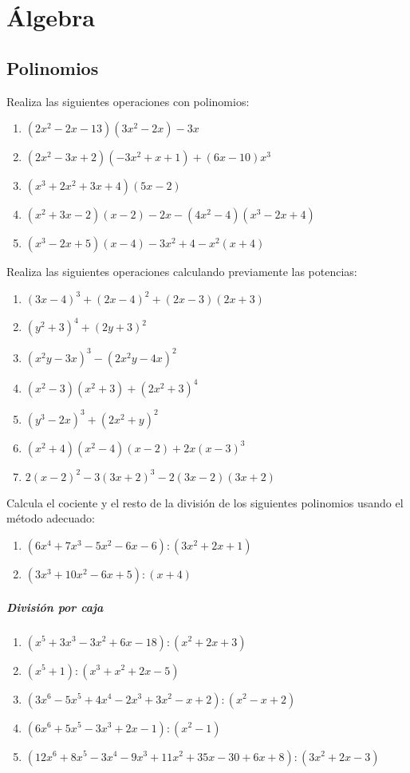 \chapter{Álgebra}
\setcounter{exercicio}{0}

\section{Polinomios}

\Exercicio Realiza las siguientes operaciones con polinomios:
\begin{enumerate}[topsep=0pt]
	\item $(2x^2-2x-13)(3x^2-2x)-3x$
	\item $(2x^2-3x+2)(-3x^2+x+1) + (6x-10)x^3$
	\item $(x^3+2x^2+3x+4)(5x-2)$
	\item $(x^2+3x -2)(x-2) - 2x - (4x^2-4)(x^3-2x+4)$
	\item $(x^3-2x+5)(x-4) - 3x^2 + 4 - x^2(x+4)$
\end{enumerate}


\Exercicio Realiza las siguientes operaciones calculando previamente las potencias:
\begin{enumerate}[topsep=0pt]
	\item $(3x-4)^3 + (2x - 4)^2 + (2x - 3)(2x+3)$
	\item $(y^2+3)^4 + (2y +3)^2$
	\item $(x^2y -3x)^3 - (2x^2y- 4x)^2$
	\item $(x^2-3)(x^2+3) + (2x^2+3)^4$
	\item $(y^3-2x)^3 + (2x^2+y)^2$
	\item $(x^2+4)(x^2-4)(x-2) + 2x(x-3)^3$
	\item $2(x-2)^2 - 3(3x+2)^3 - 2(3x-2)(3x+2)$
\end{enumerate}


\Exercicio Calcula el cociente y el resto de la división de los siguientes polinomios usando el método adecuado:
\begin{enumerate}[topsep=0pt]
	\item $(6x^4+7x^3-5x^2-6x-6):(3x^2+2x+1)$
	\item $(3x^3+10x^2-6x+5):(x+4)$
\end{enumerate}
\paragraph{División por caja}
\begin{enumerate}[topsep=0pt]
	\item $(x^5+3x^3-3x^2+6x-18):(x^2+2x+3)$
	\item $(x^5 + 1) : (x^3 + x^2 + 2x - 5)$
	\item $(3x^6 - 5x^5 + 4x^4 - 2x^3 + 3x^2 - x + 2) : (x^2 - x + 2)$
	\item $(6x^6 + 5x^5 - 3x^3 + 2x - 1) : (x^2 - 1)$
	\item $(12x^6+8x^5-3x^4-9x^3+11x^2+35x-30+6x+8):(3x^2+2x-3)$
\end{enumerate}

